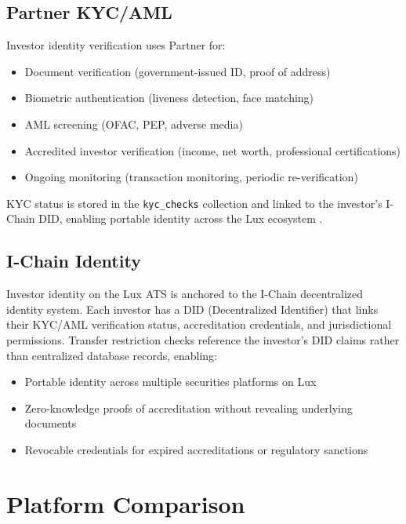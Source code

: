 \documentclass[11pt,a4paper]{article}
\begin{document}
\subsection{Partner KYC/AML}

Investor identity verification uses Partner for:

\begin{itemize}[nosep]
  \item Document verification (government-issued ID, proof of address)
  \item Biometric authentication (liveness detection, face matching)
  \item AML screening (OFAC, PEP, adverse media)
  \item Accredited investor verification (income, net worth, professional certifications)
  \item Ongoing monitoring (transaction monitoring, periodic re-verification)
\end{itemize}

KYC status is stored in the \texttt{kyc\_checks} collection and linked to the investor's I-Chain DID, enabling portable identity across the Lux ecosystem \cite{lux-transfer-agent}.

\subsection{I-Chain Identity}

Investor identity on the Lux ATS is anchored to the I-Chain decentralized identity system. Each investor has a DID (Decentralized Identifier) that links their KYC/AML verification status, accreditation credentials, and jurisdictional permissions. Transfer restriction checks reference the investor's DID claims rather than centralized database records, enabling:

\begin{itemize}[nosep]
  \item Portable identity across multiple securities platforms on Lux
  \item Zero-knowledge proofs of accreditation without revealing underlying documents
  \item Revocable credentials for expired accreditations or regulatory sanctions
\end{itemize}

\section{Platform Comparison}\label{sec:comparison}
\end{document}
